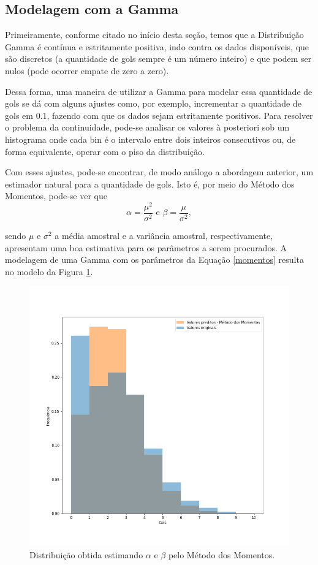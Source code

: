 \documentclass[11pt,letterpaper,twocolumn]{article}
\begin{document}
\subsection{Modelagem com a Gamma}
\label{gamma}
\justify

Primeiramente, conforme citado no início desta seção, temos que a Distribuição Gamma é contínua e estritamente positiva, indo contra os dados disponíveis, que são discretos (a quantidade de gols sempre é um número inteiro) e que podem ser nulos (pode ocorrer empate de zero a zero).

Dessa forma, uma maneira de utilizar a Gamma para modelar essa quantidade de gols se dá com alguns ajustes como, por exemplo, incrementar a quantidade de gols em $0.1$, fazendo com que os dados sejam estritamente positivos. Para resolver o problema da continuidade, pode-se analisar os valores à posteriori sob um histograma onde cada bin é o intervalo entre dois inteiros consecutivos ou, de forma equivalente, operar com o piso da distribuição.

Com esses ajustes, pode-se encontrar, de modo análogo a abordagem anterior, um estimador natural para a quantidade de gols. Isto é, por meio do Método dos Momentos, pode-se ver que
\begin{equation}
    \alpha = \dfrac{\mu^2}{\sigma^2}\text{ e } \beta = \dfrac{\mu}{\sigma^2},
    \label{momentos}
\end{equation}

\noindent sendo $\mu$ e $\sigma^2$ a média amostral e a variância amostral, respectivamente, apresentam uma boa estimativa para os parâmetros a serem procurados. A modelagem de uma Gamma com os parâmetros da Equação \ref{momentos} resulta no modelo da Figura \ref{fig04g}.
\begin{figure}[hbt]
    \centering
    \includegraphics[scale = 0.40, center]{Gamma/fig04 - gamma.png}
    \caption{Distribuição obtida estimando $\alpha$ e $\beta$ pelo Método dos Momentos.}
    \label{fig04g}
\end{figure}
\end{document}
